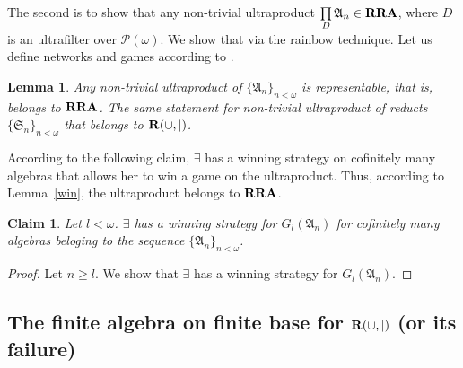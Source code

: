 \documentclass[a4paper]{article}
\theoremstyle{defin}
\theoremstyle{theorem}
\theoremstyle{prop}
\theoremstyle{lemma}
\newtheorem{lemma}{Lemma}
\theoremstyle{ex}
\theoremstyle{col}
\theoremstyle{claim}
\newtheorem{claim}{Claim}
\begin{document}
The second is to show that any non-trivial ultraproduct $\prod \limits_{D} \mathfrak{A}_n \in {\bf RRA}$, where $D$ is an ultrafilter over $\mathcal{P}(\omega)$. We show that via the rainbow technique. Let us define networks and games according to \cite{hirsch1997step}.

\begin{lemma}
  Any non-trivial ultraproduct of $\{ \mathfrak{A}_n \}_{n < \omega}$ is representable, that is, belongs to ${\bf RRA}$. The same statement for non-trivial ultraproduct of reducts $\{ \mathfrak{S}_n \}_{n < \omega}$ that belongs to ${\bf R}(\cup, |)$.
\end{lemma}

According to the following claim, $\exists$ has a winning strategy on cofinitely many algebras that allows her to win a game on the ultraproduct. Thus, according to Lemma~\ref{win}, the ultraproduct belongs to ${\bf RRA}$.

\begin{claim}
  Let $l < \omega$. $\exists$ has a winning strategy for $G_l(\mathfrak{A}_n)$ for cofinitely many algebras beloging to the sequence $\{ \mathfrak{A}_n \}_{n < \omega}$.
\end{claim}

\begin{proof}
  Let $n \geq l$. We show that $\exists$ has a winning strategy for $G_l(\mathfrak{A}_n)$.
\end{proof}

\subsection{The finite algebra on finite base for ${\bf R}(\cup, |)$ (or its failure)}



\end{document}
